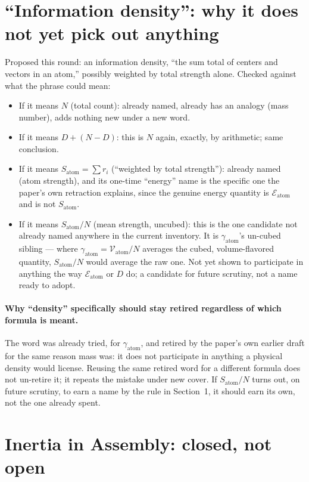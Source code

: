 \documentclass[11pt]{article}
\begin{document}
\section{``Information density'': why it does not yet pick out
anything}

Proposed this round: an information density, ``the sum total of
centers and vectors in an atom,'' possibly weighted by total strength
alone. Checked against what the phrase could mean:

\begin{itemize}
\item If it means $N$ (total count): already named, already has an
analogy (mass number), adds nothing new under a new word.
\item If it means $D+(N-D)$: this is $N$ again, exactly, by
arithmetic; same conclusion.
\item If it means $S_{\text{atom}}=\sum r_i$ (``weighted by total
strength''): already named (atom strength), and its one-time
``energy'' name is the specific one the paper's own retraction
explains, since the genuine energy quantity is $\mathcal{E}_{\text{atom}}$
and is not $S_{\text{atom}}$.
\item If it means $S_{\text{atom}}/N$ (mean strength, uncubed): this
is the one candidate not already named anywhere in the current
inventory. It is $\gamma_{\text{atom}}$'s un-cubed sibling --- where
$\gamma_{\text{atom}}=\mathcal{V}_{\text{atom}}/N$ averages the
cubed, volume-flavored quantity, $S_{\text{atom}}/N$ would average
the raw one. Not yet shown to participate in anything the way
$\mathcal{E}_{\text{atom}}$ or $D$ do; a candidate for future
scrutiny, not a name ready to adopt.
\end{itemize}

\paragraph{Why ``density'' specifically should stay retired regardless
of which formula is meant.} The word was already tried, for
$\gamma_{\text{atom}}$, and retired by the paper's own earlier draft
for the same reason mass was: it does not participate in anything a
physical density would license. Reusing the same retired word for a
different formula does not un-retire it; it repeats the mistake
under new cover. If $S_{\text{atom}}/N$ turns out, on future
scrutiny, to earn a name by the rule in Section~1, it should earn
its own, not the one already spent.

\section{Inertia in Assembly: closed, not open}
\end{document}
